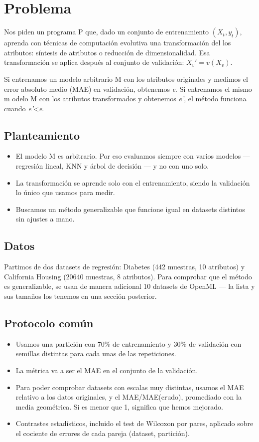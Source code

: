 \section{Problema}
Nos piden un programa P que, dado un conjunto de entrenamiento $(X_t, y_t)$, aprenda con técnicas de computación evolutiva una transformación del los atributos: síntesis de atributos o reducción de dimensionalidad. Esa transformación se aplica después al conjunto de validación: $X_v'=v(X_v)$. 

Si entrenamos un modelo arbitrario M con los atributos originales y medimos el error absoluto medio (MAE) en validación, obtenemos \textit{e}. Si entrenamos el mismo m odelo M con los atributos transformados y obtenemos \textit{e'}, el método funciona cuando \textit{e'}<\textit{e}.
\subsection{Planteamiento}
\begin{itemize}
    \item El modelo M es arbitrario. Por eso evaluamos siempre con varios modelos --- regresión lineal, KNN y árbol de decisión --- y no con uno solo. 

    \item La transformación se aprende solo con el entrenamiento, siendo la validación lo único que usamos para medir. 

    \item Buscamos un método generalizable que funcione igual en datasets distintos sin ajustes a mano. 
\end{itemize}

\subsection{Datos}
Partimos de dos datasets de regresión: Diabetes (442 muestras, 10 atributos) y California Housing (20640 muestras, 8 atributos). Para comprobar que el método es generalizable, se usan de manera adicional 10 datasets de OpenML --- la lista y sus tamaños los tenemos en una sección posterior.

\subsection{Protocolo común}
\begin{itemize}
    \item Usamos una partición con 70\% de entrenamiento y 30\% de validación con semillas distintas para cada unas de las repeticiones.

    \item La métrica va a ser el MAE en el conjunto de la validación. 

    \item Para poder comprobar datasets con escalas muy distintas, usamos el MAE relativo a los datos originales, y el MAE/MAE(crudo), promediado con la media geométrica. Si es menor que 1, significa que hemos mejorado. 

    \item Contrastes estadísticos, incluido el test de Wilcoxon por pares, aplicado sobre el cociente de errores de cada pareja (dataset, partición).
\end{itemize}